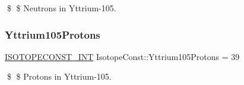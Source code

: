 \$ \$ Neutrons in Yttrium-\/105. \mbox{\label{group___isotope_const-_yttrium-_y105_gae5b9381e10b9e6ffd08252db6966f852}} 
\subsubsection{\texorpdfstring{Yttrium105\+Protons}{Yttrium105Protons}}
{\footnotesize\ttfamily \mbox{\hyperlink{group___isotope_const-_macros_ga5f18360b3e99483a35c32d789e62621c}{I\+S\+O\+T\+O\+P\+E\+C\+O\+N\+S\+T\+\_\+\+I\+NT}} Isotope\+Const\+::\+Yttrium105\+Protons = 39}

\$ \$ Protons in Yttrium-\/105. 